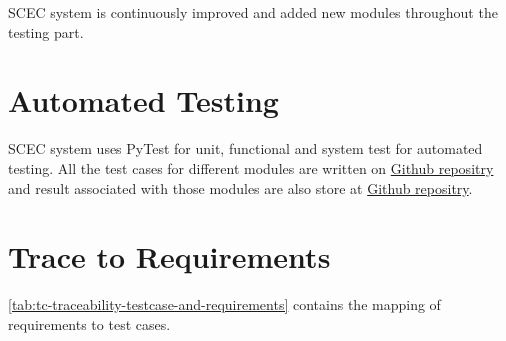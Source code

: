 \documentclass[12pt, titlepage]{article}
\begin{document}
SCEC system is continuously improved and added new modules throughout the testing part. 

\section{Automated Testing}

SCEC system uses PyTest for unit, functional and system test for automated testing. All the test cases for different modules are written on \href{https://github.com/DeeshaPatel/CAS-741-Solar-Cooker/tree/main/src/testing}{Github repositry} and result associated with those modules are also store at \href{https://github.com/DeeshaPatel/CAS-741-Solar-Cooker/tree/main/test}{Github repositry}.  
		
\section{Trace to Requirements}

\autoref{tab:tc-traceability-testcase-and-requirements} contains the mapping of requirements to test cases. 

\begin{table}[h!]
\begin{center}
\caption{Tracebility Between Test Cases and Requirements}
\label{tab:tc-traceability-testcase-and-requirements}
\end{center}
\end{table}
\end{document}
